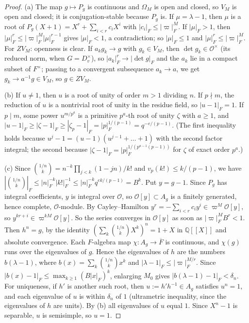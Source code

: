 \documentclass[12pt]{article}
\newcommand{\ov}[1]{\overline{#1}}
\newcommand{\cO}{\mathcal{O}}
\theoremstyle{plain}
\theoremstyle{definition}
\begin{document}
\begin{proof}
(a) The map $g\mapsto P_g$ is continuous and $\Omega_M$ is open and closed, so $V_M$ is open and closed; it is conjugation-stable because $P_g$ is. If $\mu=\lambda-1$, then $\mu$ is a root of $P_g(X+1)=X^r+\sum_{i<r}c_iX^i$ with $|c_i|_F\le|\varpi|_F^M$. If $|\mu|_F>1$, then $|\mu|_F^r\le|\varpi|_F^M|\mu|_F^{r-1}$ gives $|\mu|_F<1$, a contradiction; so $|\mu|_F\le1$ and $|\mu|_F^r\le|\varpi|_F^M$. For $ZV_M$: openness is clear. If $a_kg_k\to g$ with $g_k\in V_M$, then $\det g_k\in\cO^\times$ (its reduced norm, when $G=D_v^\times$), so $|a_k|_F^r\to|\det g|_F$ and the $a_k$ lie in a compact subset of $F^\times$; passing to a convergent subsequence $a_k\to a$, we get $g_k\to a^{-1}g\in V_M$, so $g\in ZV_M$.

(b) If $u\ne1$, then $u$ is a root of unity of order $m>1$ dividing $n$. If $p\nmid m$, the reduction of $u$ is a nontrivial root of unity in the residue field, so $|u-1|_F=1$. If $p\mid m$, some power $u^{m/p^a}$ is a primitive $p^a$-th root of unity $\zeta$ with $a\ge1$, and $|u-1|_F\ge|\zeta-1|_F\ge|\zeta_p-1|_F=|p|_F^{1/(p-1)}=q^{-e/(p-1)}$. (The first inequality holds because $u^j-1=(u-1)(u^{j-1}+\dots+1)$ with the second factor integral; the second because $|\zeta-1|_F=|p|_F^{1/(p^{a-1}(p-1))}$ for $\zeta$ of exact order $p^a$.)

(c) Since $\binom{1/n}{k}=n^{-k}\prod_{j<k}(1-jn)/k!$ and $v_p(k!)\le k/(p-1)$, we have $|\binom{1/n}{k}|_F\le|n|_F^{-k}|k!|_F^{-1}\le|n|_F^{-k}q^{ek/(p-1)}=B^k$. Put $y=g-1$. Since $P_g$ has integral coefficients, $y$ is integral over $\cO$, so $\cO[y]\subset A_g$ is a finitely generated, hence complete, $\cO$-module. By Cayley--Hamilton $y^r=-\sum_{i<r}c_iy^i\in\varpi^M\cO[y]$, so $y^{kr+i}\in\varpi^{kM}\cO[y]$. So the series converges in $\cO[y]$ as soon as $|\varpi|_F^MB^r<1$. Then $h^n=g$, by the identity $(\sum_k\binom{1/n}{k}X^k)^n=1+X$ in $\mathbb Q[[X]]$ and absolute convergence. Each $F$-algebra map $\chi:A_g\to\ov F$ is continuous, and $\chi(g)$ runs over the eigenvalues of $g$. Hence the eigenvalues of $h$ are the numbers $b(\lambda-1)$, where $b(x)=\sum_k\binom{1/n}{k}x^k$ and $|\lambda-1|_F\le|\varpi|_F^{M/r}$. Since $|b(x)-1|_F\le\max_{k\ge1}(B|x|_F)^k$, enlarging $M_0$ gives $|b(\lambda-1)-1|_F<\delta_n$. For uniqueness, if $h'$ is another such root, then $u:=h'h^{-1}\in A_g$ satisfies $u^n=1$, and each eigenvalue of $u$ is within $\delta_n$ of $1$ (ultrametric inequality, since the eigenvalues of $h$ are units). By (b) all eigenvalues of $u$ equal $1$. Since $X^n-1$ is separable, $u$ is semisimple, so $u=1$.


\end{proof}
\end{document}
